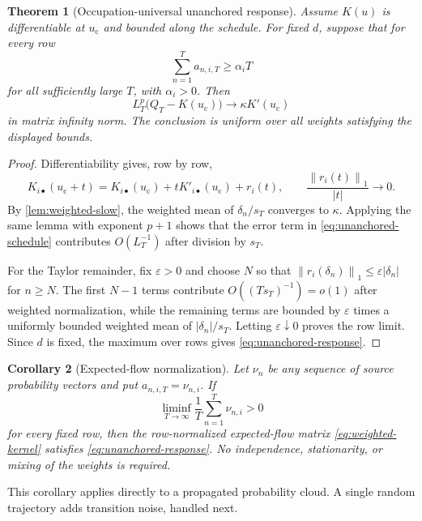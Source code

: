 \documentclass[11pt]{article}
\newtheorem{theorem}{Theorem}[section]
\newtheorem{corollary}[theorem]{Corollary}
\theoremstyle{definition}
\theoremstyle{remark}
\newcommand{\uc}{u_{\mathrm c}}
\newcommand{\norm}[1]{\left\lVert #1\right\rVert}
\begin{document}
\begin{theorem}[Occupation-universal unanchored response]
\label{thm:unanchored}
Assume $K(u)$ is differentiable at $\uc$ and bounded along the schedule.
For fixed $d$, suppose that for every row
\begin{equation}\label{eq:positive-density}
  \sum_{n=1}^T a_{n,i,T}\ge\alpha_iT
\end{equation}
for all sufficiently large $T$, with $\alpha_i>0$.  Then
\begin{equation}\label{eq:unanchored-response}
  L_T^p\bigl(Q_T-K(\uc)\bigr)
  \longrightarrow \kappa K'(\uc)
\end{equation}
in matrix infinity norm.  The conclusion is uniform over all weights
satisfying the displayed bounds.
\end{theorem}

\begin{proof}
Differentiability gives, row by row,
\[
  K_{i\bullet}(\uc+t)
  =K_{i\bullet}(\uc)+tK'_{i\bullet}(\uc)+r_i(t),
  \qquad
  \frac{\norm{r_i(t)}_1}{|t|}\longrightarrow0.
\]
By \cref{lem:weighted-slow}, the weighted mean of $\delta_n/s_T$
converges to $\kappa$.  Applying the same lemma with exponent $p+1$
shows that the error term in \eqref{eq:unanchored-schedule} contributes
$O(L_T^{-1})$ after division by $s_T$.

For the Taylor remainder, fix $\varepsilon>0$ and choose $N$ so that
$\norm{r_i(\delta_n)}_1\le\varepsilon|\delta_n|$ for $n\ge N$.
The first $N-1$ terms contribute
$O((Ts_T)^{-1})=o(1)$ after weighted normalization, while the remaining
terms are bounded by $\varepsilon$ times a uniformly bounded weighted mean
of $|\delta_n|/s_T$.  Letting $\varepsilon\downarrow0$ proves the row
limit.  Since $d$ is fixed, the maximum over rows gives
\eqref{eq:unanchored-response}.
\end{proof}

\begin{corollary}[Expected-flow normalization]\label{cor:expected-flow}
Let $\nu_n$ be any sequence of source probability vectors and put
$a_{n,i,T}=\nu_{n,i}$.  If
\[
  \liminf_{T\to\infty}\frac1T\sum_{n=1}^T\nu_{n,i}>0
\]
for every fixed row, then the row-normalized expected-flow matrix
\eqref{eq:weighted-kernel} satisfies \eqref{eq:unanchored-response}.
No independence, stationarity, or mixing of the weights is required.
\end{corollary}

This corollary applies directly to a propagated probability cloud.  A
single random trajectory adds transition noise, handled next.
\end{document}
